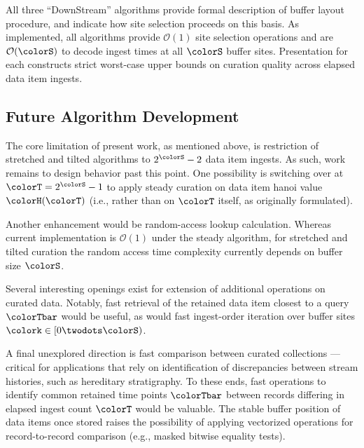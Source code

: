 All three ``DownStream'' algorithms provide formal description of buffer layout procedure, and indicate how site selection proceeds on this basis.
As implemented, all algorithms provide $\mathcal{O}(1)$ site selection operations and are $\mathcal{O}(\colorS)$ to decode ingest times at all $\colorS$ buffer sites.
Presentation for each constructs strict worst-case upper bounds on curation quality across elapsed data item ingests.

\subsection{Future Algorithm Development}

The core limitation of present work, as mentioned above, is restriction of stretched and tilted algorithms to $2^{\colorS} - 2$ data item ingests.
As such, work remains to design behavior past this point.
One possibility is switching over at $\colorT = 2^{\colorS} - 1$ to apply steady curation on data item hanoi value $\colorH(\colorT)$ (i.e., rather than on $\colorT$ itself, as originally formulated).

Another enhancement would be random-access lookup calculation.
Whereas current implementation is $\mathcal{O}(1)$ under the steady algorithm, for stretched and tilted curation the random access time complexity currently depends on buffer size $\colorS$.

Several interesting openings exist for extension of additional operations on curated data.
Notably, fast retrieval of the retained data item closest to a query $\colorTbar$ would be useful, as would fast ingest-order iteration over buffer sites $\colork \in [0 \twodots \colorS)$.

A final unexplored direction is fast comparison between curated collections --- critical for applications that rely on identification of discrepancies between stream histories, such as hereditary stratigraphy.
To these ends, fast operations to identify common retained time points $\colorTbar$ between records differing in elapsed ingest count $\colorT$ would be valuable.
The stable buffer position of data items once stored raises the possibility of applying vectorized operations for record-to-record comparison (e.g., masked bitwise equality tests).


